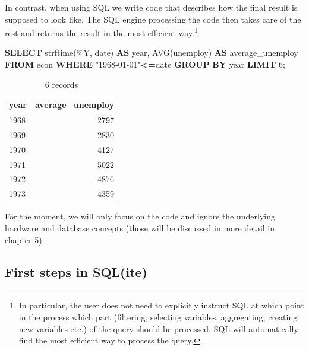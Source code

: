\documentclass[
  12pt,
]{style/krantz}
\newenvironment{Shaded}{\begin{snugshade}}{\end{snugshade}}
\newcommand{\DataTypeTok}[1]{\textcolor[rgb]{0.13,0.29,0.53}{#1}}
\newcommand{\DecValTok}[1]{\textcolor[rgb]{0.00,0.00,0.81}{#1}}
\newcommand{\FunctionTok}[1]{\textcolor[rgb]{0.00,0.00,0.00}{#1}}
\newcommand{\KeywordTok}[1]{\textcolor[rgb]{0.13,0.29,0.53}{\textbf{#1}}}
\newcommand{\NormalTok}[1]{#1}
\newcommand{\OperatorTok}[1]{\textcolor[rgb]{0.81,0.36,0.00}{\textbf{#1}}}
\newcommand{\OtherTok}[1]{\textcolor[rgb]{0.56,0.35,0.01}{#1}}
\newcommand{\StringTok}[1]{\textcolor[rgb]{0.31,0.60,0.02}{#1}}
\begin{document}
In contrast, when using SQL we write code that describes how the final result is supposed to look like. The SQL engine processing the code then takes care of the rest and returns the result in the most efficient way.\footnote{In particular, the user does not need to explicitly instruct SQL at which point in the process which part (filtering, selecting variables, aggregating, creating new variables etc.) of the query should be processed. SQL will automatically find the most efficient way to process the query.}

\begin{Shaded}
\begin{Highlighting}[]
\KeywordTok{SELECT} 
\NormalTok{strftime(}\StringTok{\textquotesingle{}\%Y\textquotesingle{}}\NormalTok{, \textasciigrave{}date\textasciigrave{})  }\KeywordTok{AS} \DataTypeTok{year}\NormalTok{,}
\FunctionTok{AVG}\NormalTok{(unemploy) }\KeywordTok{AS}\NormalTok{ average\_unemploy}
\KeywordTok{FROM}\NormalTok{ econ}
\KeywordTok{WHERE} \OtherTok{"1968{-}01{-}01"}\OperatorTok{\textless{}=}\NormalTok{\textasciigrave{}date\textasciigrave{}}
\KeywordTok{GROUP} \KeywordTok{BY} \DataTypeTok{year} \KeywordTok{LIMIT} \DecValTok{6}\NormalTok{;}
\end{Highlighting}
\end{Shaded}

\begin{table}

\caption{\label{tab:unnamed-chunk-54}6 records}
\centering
\begin{tabular}[t]{l|r}
\hline
year & average\_unemploy\\
\hline
1968 & 2797\\
\hline
1969 & 2830\\
\hline
1970 & 4127\\
\hline
1971 & 5022\\
\hline
1972 & 4876\\
\hline
1973 & 4359\\
\hline
\end{tabular}
\end{table}

For the moment, we will only focus on the code and ignore the underlying hardware and database concepts (those will be discussed in more detail in chapter 5).

\hypertarget{first-steps-in-sqlite}{%
\subsection{First steps in SQL(ite)}\label{first-steps-in-sqlite}}
\end{document}
